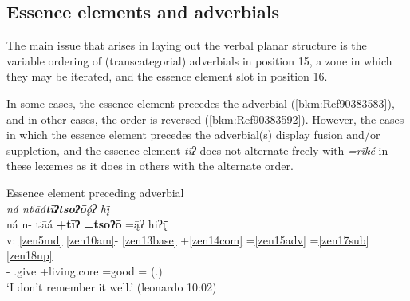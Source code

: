 \documentclass[output=paper]{langscibook}
\begin{document}


\subsection{Essence elements and adverbials}

The main issue that arises in laying out the verbal planar structure is the variable ordering of (transcategorial) adverbials in position 15, a zone in which they may be iterated, and the essence element slot in position 16.

In some cases, the essence element precedes the adverbial (\ref{bkm:Ref90383583}), and in other cases, the order is reversed (\ref{bkm:Ref90383592}). However, the cases in which the essence element precedes the adverbial(s) display fusion and/or suppletion, and the essence element \textit{tīʔ} does not alternate freely with \textit{=rīké} in these lexemes as it does in others with the alternate order. 



\ea\label{bkm:Ref90383583}Essence element preceding adverbial\\
\textit{ná ntʲāá\textbf{tīʔtsoʔō}ǫ́ʔ hį̄} \\  
\glll {} ná n- tʲāá \textbf{+tīʔ} \textbf{=tsoʔō} =ą̄ʔ hiʔ\={\k{ı}}\\
v: \ref{zen5md} \ref{zen10am}{}- \ref{zen13base} +\ref{zen14com} =\ref{zen15adv} =\ref{zen17sub} \ref{zen18np} \\
{} \Neg{} \Hab{}- \Iter{}.give +living.core =good =\First\Sg{} \Obj{}(.\Third{})\\
\glt `I don't remember it well.' (leonardo 10:02)
\z
\end{document}
